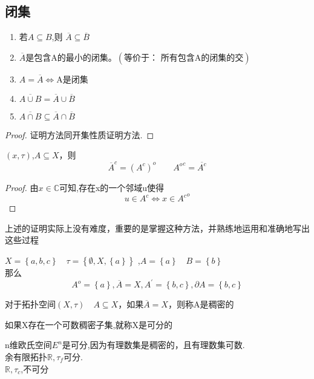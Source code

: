\subsection*{闭集}
\begin{corollary}
    \begin{enumerate}
        \item 若\(A \subseteq B\),则 \(\overline{A} \subseteq \overline{B}\) \\
        \item \(\overline{A}\)是包含A的最小的闭集。\(\left(\text{等价于： 所有包含A的闭集的交}\right)\) \\
        \item \(A = \overline{A} \Longleftrightarrow \text{A是闭集} \) \\
        \item \(\overline{A \cup B} = \overline{A} \cup \overline{B}\) \\
        \item \(\overline{A \cap B} \subseteq \overline{A} \cap \overline{B}\)
    \end{enumerate}
\end{corollary}
\begin{proof}
    证明方法同开集性质证明方法.
\end{proof}
\begin{corollary}
    \(\left(x,\tau\right)\),\(A \subseteq X\)，则\[{\overline{A}}^{c}={\left(A^c\right)^{o}} \qquad {A^o}^c=\overline{A^c}\]
\end{corollary}
\begin{proof}
    由\(x \in \mathbb{C}\)可知,存在x的一个邻域u使得 \[u \in A^c \Longleftrightarrow x \in {A^c}^o\]
\end{proof}
\begin{note}
    上述的证明实际上没有难度，重要的是掌握这种方法，并熟练地运用和准确地写出这些过程
\end{note}
\begin{example}
    \(X=\left\{a,b,c\right\} \quad \tau=\left\{\emptyset,X,\left\{a\right\}\right\}\)
    ,\(A = \left\{a\right\} \quad B=\left\{b\right\}\)
\\
    那么 \[A^o=\left\{a\right\},\overline{A}=X,A^{'}=\left\{b,c\right\},\partial A =\left\{b,c\right\}\]
\end{example}
\begin{definition}
    对于拓扑空间\(\left(X,\tau \right) \quad A \subseteq X\)，如果\(\overline{A}=X\)，则称A是稠密的 
\end{definition}
\begin{definition}
    如果X存在一个可数稠密子集,就称X是可分的
\end{definition}
\begin{example}
    n维欧氏空间\(E^n\)是可分,因为有理数集是稠密的，且有理数集可数. \\
    余有限拓扑\(\mathbb{R},\tau_f\)可分.\\
    \(\mathbb{R},\tau_c\),不可分
\end{example}
